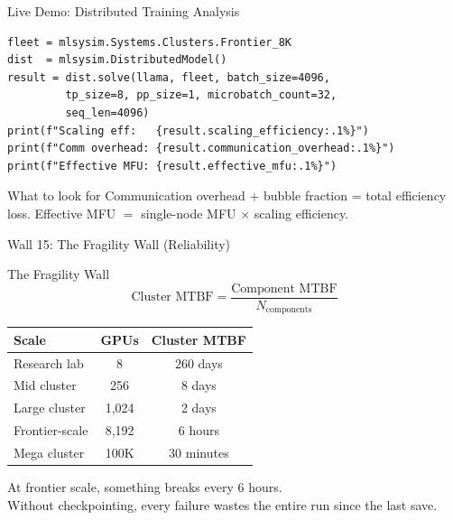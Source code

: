 \documentclass[aspectratio=169, 12pt]{beamer}
\newcommand{\wallbox}[2]{%
  \begin{block}{#1}#2\end{block}%
}
\begin{document}
\begin{frame}[fragile]{Live Demo: Distributed Training Analysis}

\small
\begin{lstlisting}
fleet = mlsysim.Systems.Clusters.Frontier_8K
dist  = mlsysim.DistributedModel()
result = dist.solve(llama, fleet, batch_size=4096,
         tp_size=8, pp_size=1, microbatch_count=32,
         seq_len=4096)
print(f"Scaling eff:   {result.scaling_efficiency:.1%}")
print(f"Comm overhead: {result.communication_overhead:.1%}")
print(f"Effective MFU: {result.effective_mfu:.1%}")
\end{lstlisting}

\vspace{0.2cm}
\begin{exampleblock}{What to look for}
  Communication overhead + bubble fraction = total efficiency loss.
  Effective MFU $=$ single-node MFU $\times$ scaling efficiency.
\end{exampleblock}
\end{frame}

\begin{frame}{Wall 15: The Fragility Wall (Reliability)}

\small
\wallbox{The Fragility Wall}{
\[
  \text{Cluster MTBF} = \frac{\text{Component MTBF}}{N_{\text{components}}}
\]
}

\vspace{0.2cm}
\begin{tabular}{lcc}
\toprule
\textbf{Scale} & \textbf{GPUs} & \textbf{Cluster MTBF} \\
\midrule
Research lab   & 8     & 260 days \\
Mid cluster    & 256   & 8 days \\
Large cluster  & 1,024 & 2 days \\
Frontier-scale & 8,192 & 6 hours \\
Mega cluster   & 100K  & 30 minutes \\
\bottomrule
\end{tabular}

\vspace{0.2cm}
\alert{At frontier scale, something breaks every 6 hours.\\
Without checkpointing, every failure wastes the entire run since the last save.}
\end{frame}
\end{document}
